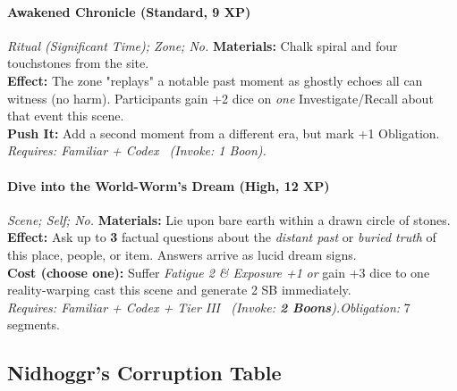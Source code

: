 \paragraph{Awakened Chronicle (Standard, 9 XP)} \emph{Ritual (Significant Time); Zone; No.}
\textbf{Materials:} Chalk spiral and four touchstones from the site.\\
\textbf{Effect:} The zone "replays" a notable past moment as ghostly echoes all can witness (no harm). Participants gain +2 dice on \emph{one} Investigate/Recall about that event this scene.\\
\textbf{Push It:} Add a second moment from a different era, but mark +1 Obligation.\\
\emph{Requires: Familiar + Codex \ (\textit{Invoke:} 1 Boon).}

\paragraph{Dive into the World-Worm's Dream (High, 12 XP)} \emph{Scene; Self; No.}
\textbf{Materials:} Lie upon bare earth within a drawn circle of stones.\\
\textbf{Effect:} Ask up to \textbf{3} factual questions about the \emph{distant past} or \emph{buried truth} of this place, people, or item. Answers arrive as lucid dream signs.\\
\textbf{Cost (choose one):} Suffer \emph{Fatigue 2 \& Exposure +1} \emph{or} gain +3 dice to one reality-warping cast this scene and generate 2 SB immediately.\\
\emph{Requires: Familiar + Codex + Tier III \ (\textit{Invoke:} \textbf{2 Boons}).}\quad \emph{Obligation:} 7 segments.

\subsection*{Nidhoggr's Corruption Table}
\label{sec:nidhoggr-corruption}

